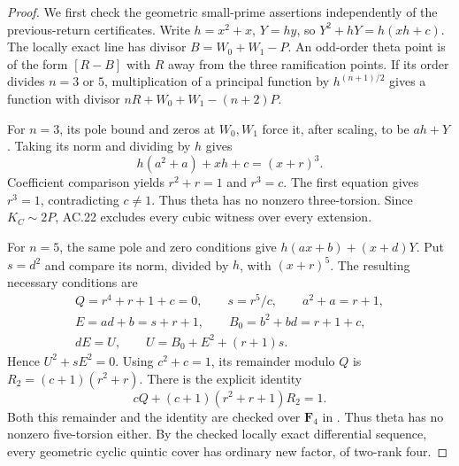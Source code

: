 \begin{proof}
We first check the geometric small-prime assertions independently of
the previous-return certificates.  Write $h=x^2+x$, $Y=hy$, so
$Y^2+hY=h(xh+c)$.  The locally exact line has divisor
$B=W_0+W_1-P$.  An odd-order theta point is of the form $[R-B]$ with
$R$ away from the three ramification points.  If its order divides
$n=3$ or $5$, multiplication of a principal function by
$h^{(n+1)/2}$ gives a function with divisor
$nR+W_0+W_1-(n+2)P$.

For $n=3$, its pole bound and zeros at $W_0,W_1$ force it, after
scaling, to be $ah+Y$.  Taking its norm and dividing by $h$ gives
\[
             h(a^2+a)+xh+c=(x+r)^3.
\]
Coefficient comparison yields $r^2+r=1$ and $r^3=c$.
The first equation gives $r^3=1$, contradicting $c\ne1$.
Thus theta has no nonzero three-torsion.  Since $K_C\sim2P$,
AC.22 excludes every cubic witness over every extension.

For $n=5$, the same pole and zero conditions give
$h(ax+b)+(x+d)Y$.  Put $s=d^2$ and compare its norm, divided by $h$,
with $(x+r)^5$.  The resulting necessary conditions are
\[
 \begin{gathered}
 Q=r^4+r+1+c=0,\qquad s=r^5/c,\qquad a^2+a=r+1,\\
 E=ad+b=s+r+1,\qquad B_0=b^2+bd=r+1+c,\\
 dE=U,\qquad U=B_0+E^2+(r+1)s.
 \end{gathered}
\]
Hence $U^2+sE^2=0$.
Using $c^2+c=1$, its remainder modulo $Q$ is
$R_2=(c+1)(r^2+r)$.  There is the explicit identity
\[
                    cQ+(c+1)(r^2+r+1)R_2=1.
\]
Both this remainder and the identity are checked over $\mathbf F_4$
in .  Thus theta has no nonzero
five-torsion either.  By the checked locally exact differential
sequence, every geometric cyclic quintic cover has ordinary new
factor, of two-rank four.


\end{proof}

